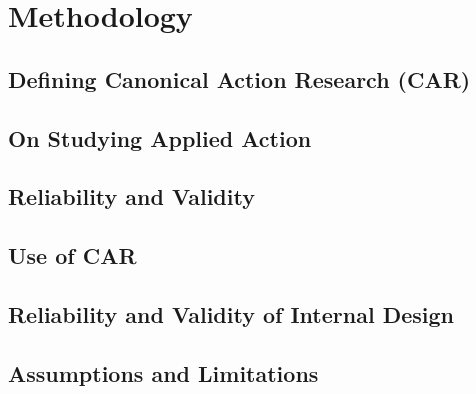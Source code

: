 \chapter{Methodology}

\section{Defining Canonical Action Research (CAR)}

\section{On Studying Applied Action}

\section{Reliability and Validity}

\section{Use of CAR}

\section{Reliability and Validity of Internal Design}

\section{Assumptions and Limitations}